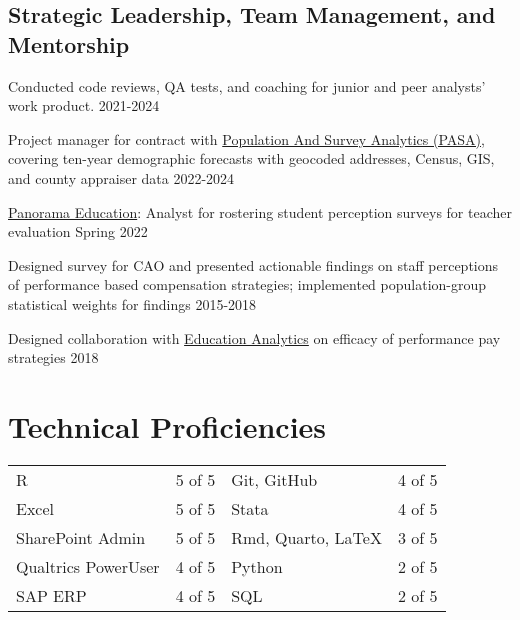 \documentclass[
  11pt,
]
{article}
\renewenvironment{itemize}{
  \begin{list}{}{
    \setlength{\leftmargin}{1.5em}
  }
}{
  \end{list}
}
\begin{document}
\subsection{\texorpdfstring{\textbf{Strategic Leadership, Team
Management, and
Mentorship}}{Strategic Leadership, Team Management, and Mentorship}}\label{strategic-leadership-team-management-and-mentorship}

\begin{itemize}
\item
  Conducted code reviews, QA tests, and coaching for junior and peer
  analysts' work product. \hfill 2021-2024
\item
  Project manager for contract with
  \href{https://pasatx.com/}{Population And Survey Analytics (PASA)},
  covering ten-year demographic forecasts with geocoded addresses,
  Census, GIS, and county appraiser data \hfill 2022-2024
\item
  \href{https://www.panoramaed.com/about}{Panorama Education}: Analyst
  for rostering student perception surveys for teacher evaluation
  \hfill Spring 2022
\item
  Designed survey for CAO and presented actionable findings on staff
  perceptions of performance based compensation strategies; implemented
  population-group statistical weights for findings \hfill 2015-2018
\item
  Designed collaboration with
  \href{https://www.edanalytics.org/who-we-are}{Education Analytics} on
  efficacy of performance pay strategies \hfill 2018
\end{itemize}

\section{Technical Proficiencies}\label{technical-proficiencies}

\begin{tabular}{ p{4cm} | p{1.5cm} | p{4cm} | p{1.5cm}  }
\hline
R                   & 5 of 5  &  Git, GitHub & 4 of 5 \\
Excel               & 5 of 5  &   Stata       & 4 of 5 \\
SharePoint Admin    & 5 of 5  &  Rmd, Quarto, LaTeX  & 3 of 5  \\ 
Qualtrics PowerUser & 4 of 5  & Python      & 2 of 5 \\ 
SAP ERP             & 4 of 5  & SQL      & 2 of 5 \\
\end{tabular}
\end{document}
